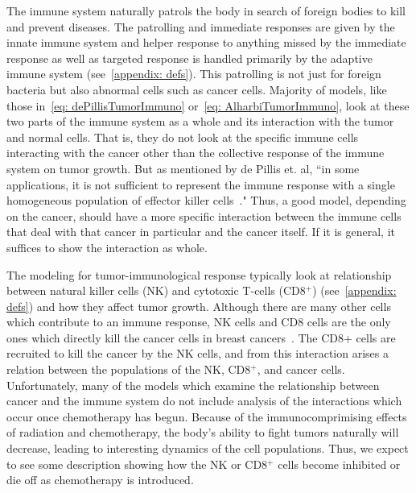 \documentclass[11pt]{amsart}
\begin{document}
The immune system naturally patrols the body in search of foreign bodies to kill and prevent diseases.
The patrolling and immediate responses are given by the innate immune system and helper response to anything missed by the immediate response as well as targeted response is handled primarily by the adaptive immune system (see\ \ref{appendix: defs}).
This patrolling is not just for foreign bacteria but also abnormal cells such as cancer cells. 
Majority of models, like those in\ \ref{eq: dePillisTumorImmuno} or\ \ref{eq: AlharbiTumorImmuno}, look at these two parts of the immune system as  a whole and its interaction with the tumor and normal cells.
That is, they do not look at the specific immune cells interacting with the cancer other than the collective response of the immune system on tumor growth.
But as mentioned by de Pillis et. al, ``in some applications, it is not sufficient to represent the immune response with a single homogeneous population of
effector killer cells\ \cite{dePillis2014461}."
Thus, a good model, depending on the cancer, should have a more specific interaction between the immune cells that deal with that cancer in particular and the cancer itself.
If it is general, it suffices to show the interaction as whole.

The modeling for tumor-immunological response typically look at relationship between natural killer cells (NK) and cytotoxic T-cells (CD8$^+$) (see\ \ref{appendix: defs}) and how they affect tumor growth.
Although there are many other cells which contribute to an immune response, NK cells and CD8 cells are the only ones which directly kill the cancer cells in breast cancers\ \cite{Amens21}.
The CD8+ cells are recruited to kill the cancer by the NK cells, and from this interaction arises a relation between the populations of the NK, CD8$^+$, and cancer cells. 
Unfortunately, many of the models which examine the relationship between cancer and the immune system do not include analysis of the interactions which occur once chemotherapy has begun.
Because of the immunocomprimising effects of radiation and chemotherapy, the body's ability to fight tumors naturally will decrease, leading to interesting dynamics of the cell populations.
Thus, we expect to see some description showing how the NK or CD8$^+$ cells become inhibited or die off as chemotherapy is introduced.
\end{document}
